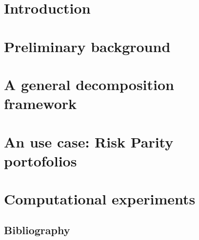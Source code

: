 \documentclass[preprint,12pt]{elsarticle}
\begin{document}

\section{Introduction}

\clearpage
\section{Preliminary background}\label{sect:2}

\clearpage
\section{A general decomposition framework}

\clearpage
%
\section{An use case: Risk Parity portofolios}

\clearpage
\section{Computational experiments}

\clearpage




\begin{thebibliography}{00}
\section{Bibliography}


\end{thebibliography}
\end{document}
